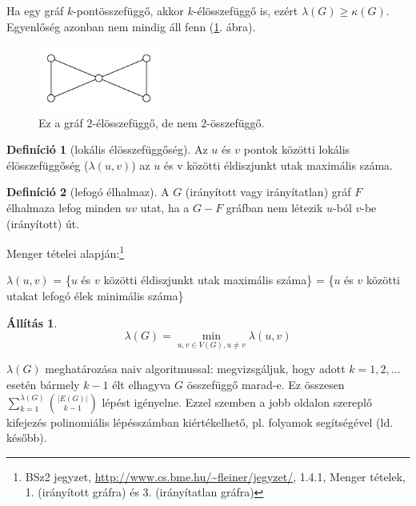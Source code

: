\documentclass{article}
\theoremstyle{definition}
\newtheorem*{definicio}{Definíció}
\newtheorem*{allitas}{Állítás}
\begin{document}
Ha egy gráf $k$-pontösszefüggő, akkor $k$-élösszefüggő is, ezért $\lambda(G) \geq \kappa(G)$. Egyenlőség azonban nem mindig áll fenn (\ref{fig:osszefuggosegek}. ábra).

\begin{figure}
\centering
\includegraphics[width=40mm,keepaspectratio]{figures/osszefuggoseg_pelda.pdf}
\caption{Ez a gráf 2-élösszefüggő, de nem 2-összefüggő.}
\label{fig:osszefuggosegek}
\end{figure}

\begin{definicio}[lokális élösszefüggőség]
Az $u$ és $v$ pontok közötti lokális élösszefüggőség ($\lambda(u, v)$) az $u$ és v közötti éldiszjunkt utak maximális száma.
\end{definicio}

\begin{definicio}[lefogó élhalmaz]
A $G$ (irányított vagy irányítatlan) gráf $F$ élhalmaza lefog minden $uv$ utat, ha a $G-F$ gráfban nem létezik $u$-ból $v$-be (irányított) út.
\end{definicio}

Menger tételei alapján:\footnote{BSz2 jegyzet, \url{http://www.cs.bme.hu/~fleiner/jegyzet/}, 1.4.1, Menger tételek, 1. (irányított gráfra) és 3. (irányítatlan gráfra)}

$\lambda(u, v)$ = \{$u$ és $v$ közötti éldiszjunkt utak maximális száma\} = \{$u$ és $v$ közötti utakat lefogó élek minimális száma\}

\begin{allitas}
\[ \lambda(G) = \min_{u, v \in V(G), u \neq v} \lambda(u, v) \]
\end{allitas}

$\lambda(G)$ meghatározása naiv algoritmussal: megvizsgáljuk, hogy adott $k = 1, 2, \ldots$ esetén bármely $k-1$ élt elhagyva $G$ összefüggő marad-e. Ez összesen $\sum_{k=1}^{\lambda(G)} {|E(G)| \choose k-1}$ lépést igényelne. Ezzel szemben a jobb oldalon szereplő kifejezés polinomiális lépésszámban kiértékelhető, pl. folyamok segítségével (ld. később).
\end{document}
